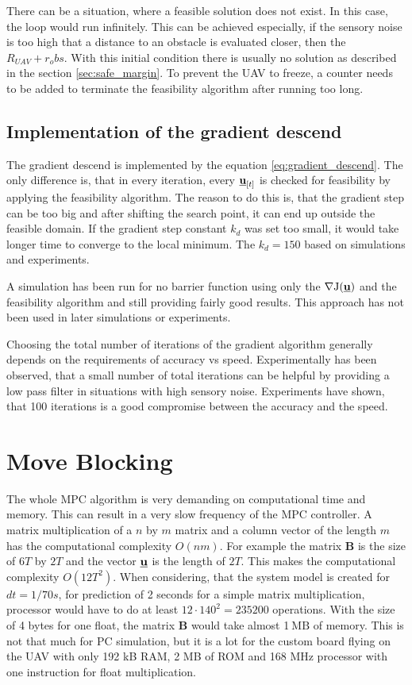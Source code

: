 \documentclass[a4paper,11pt,titlepage]{article}
\newcommand{\uvec}{\textbf{\underline{u}}}
\newcommand{\macJ}{\mathrm{J}(\uvec)}
\newcommand{\jed}[1]{\ensuremath{~\mathrm{#1}}}
\begin{document}
There can be a situation, where a feasible solution does not exist. In this case, the loop would run infinitely. This can be achieved especially, if the sensory noise is too high that a distance to an obstacle is evaluated closer, then the $R_{UAV} + r_obs$. With this initial condition there is usually no solution as described in the section \ref{sec:safe_margin}. To prevent the UAV to freeze, a counter needs to be added to terminate the feasibility algorithm after running too long.

\subsection{Implementation of the gradient descend}
\label{sec:implementation_of_the_gradient_descend}
The gradient descend is implemented by the equation \ref{eq:gradient_descend}. The only difference is, that in every iteration, every $\uvec_{[t]}$ is checked for feasibility by applying the feasibility algorithm. The reason to do this is, that the gradient step can be too big and after shifting the search point, it can end up outside the feasible domain. If the gradient step constant $k_d$ was set too small, it would take longer time to converge to the local minimum. The $k_d = 150$ based on simulations and experiments.

A simulation has been run for no barrier function using only the $\nabla \macJ$ and the feasibility algorithm and still providing fairly good results. This approach has not been used in later simulations or experiments.

Choosing the total number of iterations of the gradient algorithm generally depends on the requirements of accuracy vs speed. Experimentally has been observed, that a small number of total iterations can be helpful by providing a low pass filter in situations with high sensory noise. Experiments have shown, that 100 iterations is a good compromise between the accuracy and the speed.

\section{Move Blocking}

The whole MPC algorithm is very demanding on computational time and memory. This can result in a very slow frequency of the MPC controller. A matrix multiplication of a $n$ by $m$ matrix and a column vector of the length $m$ has the computational complexity $O(nm)$. For example the matrix $\textbf{\^B}$ is the size of $6T$ by $2T$ and the vector $\uvec$ is the length of $2T$. This makes the computational complexity $O(12T^2)$. When considering, that the system model is created for $dt = 1/70s$, for prediction of 2 seconds for a simple matrix multiplication, processor would have to do at least $12 \cdot  140^2 = 235 200$ operations. With the size of 4 bytes for one float, the matrix $\textbf{\^B}$ would take almost 1\jed{MB} of memory. This is not that much for PC simulation, but it is a lot for the custom board flying on the UAV with only 192 kB RAM, 2 MB of ROM and 168 MHz processor with one instruction for float multiplication. 
\end{document}
